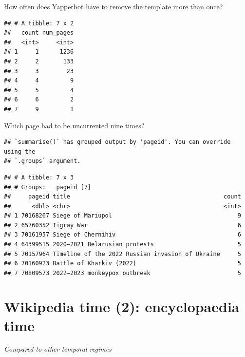 \documentclass[Royal,times,sageh]{sagej}
\begin{document}
How often does Yapperbot have to remove the template more than once?

\begin{verbatim}
## # A tibble: 7 x 2
##   count num_pages
##   <int>     <int>
## 1     1      1236
## 2     2       133
## 3     3        23
## 4     4         9
## 5     5         4
## 6     6         2
## 7     9         1
\end{verbatim}

Which page had to be uncurrented nine times?

\begin{verbatim}
## `summarise()` has grouped output by 'pageid'. You can override using the
## `.groups` argument.
\end{verbatim}

\begin{verbatim}
## # A tibble: 7 x 3
## # Groups:   pageid [7]
##     pageid title                                            count
##      <dbl> <chr>                                            <int>
## 1 70168267 Siege of Mariupol                                    9
## 2 65760352 Tigray War                                           6
## 3 70161957 Siege of Chernihiv                                   6
## 4 64399515 2020–2021 Belarusian protests                        5
## 5 70157964 Timeline of the 2022 Russian invasion of Ukraine     5
## 6 70160923 Battle of Kharkiv (2022)                             5
## 7 70809573 2022–2023 monkeypox outbreak                         5
\end{verbatim}

\hypertarget{wikipedia-time-2-encyclopaedia-time}{%
\section{Wikipedia time (2): encyclopaedia
time}\label{wikipedia-time-2-encyclopaedia-time}}

\emph{Compared to other temporal regimes}



\end{document}

